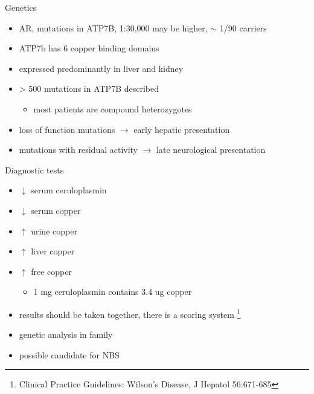 \documentclass[presentation, smaller]{beamer}
\begin{document}
\begin{frame}[label={sec:orgfc3a191}]{Genetics}
\begin{itemize}
\item AR, mutations in ATP7B, 1:30,000 may be higher, \(\sim\) 1/90 carriers
\item ATP7b has 6 copper binding domains
\item expressed predominantly in liver and kidney
\item > 500 mutations in ATP7B described
\begin{itemize}
\item most patients are compound heterozygotes
\end{itemize}
\item loss of function mutations \(\to\) early hepatic presentation
\item mutations with residual activity \(\to\) late neurological presentation
\end{itemize}
\end{frame}

\begin{frame}[label={sec:org7f18729}]{Diagnostic tests}
\begin{itemize}
\item \(\downarrow\) serum ceruloplasmin
\item \(\downarrow\) serum copper
\item \(\uparrow\) urine copper
\item \(\uparrow\) liver copper
\item \(\uparrow\) free copper
\begin{itemize}
\item 1 mg ceruloplasmin contains 3.4 ug copper
\end{itemize}
\item results should be taken together, there is a scoring system \footnote{Clinical Practice Guidelines: Wilson's Disease, J Hepatol 56:671-685}
\item genetic analysis in family

\item possible candidate for NBS
\end{itemize}
\end{frame}
\end{document}

